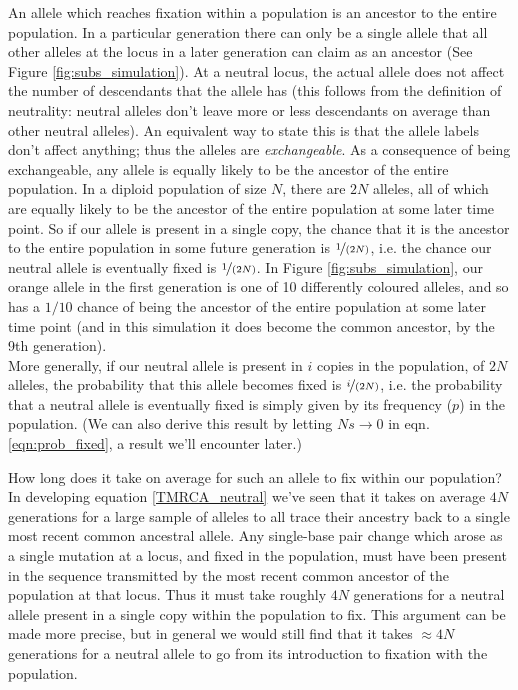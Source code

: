 An allele which reaches fixation within a population is an ancestor to the
entire population. In a particular generation there can only be a single allele
that all other alleles at the locus in a later generation can claim as an
ancestor (See Figure \ref{fig:subs_simulation}). At a neutral locus, the actual allele does not affect the number of
descendants that the allele has (this follows from the definition of
neutrality: neutral alleles don't leave more or less descendants on average than other neutral alleles).
An equivalent way to state this is that the allele labels don't affect
anything; thus the alleles are \emph{exchangeable}. As a consequence of being exchangeable,
any allele is equally likely to be the ancestor of the entire population.  In a
diploid population of size $N$, there are $2N$ alleles, all of which are
equally likely to be the ancestor of the entire population at some later time
point. So if our allele is present in a single copy, the chance that it is the
ancestor to the entire population in some future generation is
$\nicefrac{1}{(2N)}$, i.e. the chance our neutral allele is eventually fixed is
$\nicefrac{1}{(2N)}$.  In Figure \ref{fig:subs_simulation}, our orange allele
in the first generation is one of 10 differently coloured alleles, and so has a
$1/10$ chance of being the ancestor of the entire population at some later time
point (and in this simulation it does become the common ancestor, by the 9th generation).\\

More generally, if our neutral allele is present in $i$ copies in the
population, of $2N$ alleles, the probability that this allele becomes fixed is
$\nicefrac{i}{(2N)}$, i.e. the probability that a neutral allele is eventually
fixed is simply given by its frequency ($p$) in the population.  (We can also
derive this result by letting $Ns \rightarrow 0$ in eqn.
\eqref{eqn:prob_fixed}, a result we'll encounter later.)



How long does it take on average for
such an allele to fix within our population? In developing
equation \eqref{TMRCA_neutral} we've seen that it takes on average $4N$
generations for a large sample of alleles to all trace their ancestry back to a
single most recent common ancestral allele. Any single-base pair change which arose as a single mutation at a locus, and fixed in the population, must have been present in the sequence transmitted by the most recent common ancestor of the population at that locus. Thus it must take roughly $4N$ generations
for a neutral allele present in a single copy within the population to fix.
 This argument can be made more
precise, but in general we would still find that it takes $\approx 4N$
generations for a neutral allele to go from its introduction to fixation with
the population.   \\

